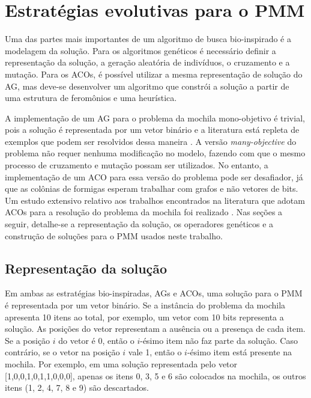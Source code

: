 \chapter[Estratégias evolutivas para o PMM]{Estratégias evolutivas para o PMM}

Uma das partes mais importantes de um algoritmo de busca bio-inspirado é a modelagem da solução. Para os algoritmos genéticos é necessário definir a representação da solução, a geração aleatória de indivíduos, o cruzamento e a mutação. Para os ACOs, é possível utilizar a mesma representação de solução do AG, mas deve-se desenvolver um algoritmo que constrói a solução a partir de uma estrutura de feromônios e uma heurística.

A implementação de um AG para o problema da mochila mono-objetivo é trivial, pois a solução é representada por um vetor binário e a literatura está repleta de exemplos que podem ser resolvidos dessa maneira \cite{KnapsackGA,Hristakeva2013}. A versão \textit{many-objective} do problema não requer nenhuma modificação no modelo, fazendo com que o mesmo processo de cruzamento e mutação possam ser utilizados. No entanto, a implementação de um ACO para essa versão do problema pode ser desafiador, já que as colônias de formigas esperam trabalhar com grafos e não vetores de bits. Um estudo extensivo relativo aos trabalhos encontrados na literatura que adotam ACOs para a resolução do problema da mochila foi realizado \cite{Ke2010,kong2008,changdar2013,Alaya2004,Alaya2007}. Nas seções a seguir, detalhe-se a representação da solução, os operadores genéticos e a construção de soluções para o PMM usados neste trabalho.

\section{Representação da solução}
Em ambas as estratégias bio-inspiradas, AGs e ACOs, uma solução para o PMM é representada por um vetor binário. Se a instância do problema da mochila apresenta 10 itens ao total, por exemplo, um vetor com 10 bits representa a solução. As posições do vetor representam a ausência ou a presença de cada item. Se a posição $i$ do vetor é 0, então o $i$-ésimo item não faz parte da solução. Caso contrário, se o vetor na posição $i$ vale 1, então o  $i$-ésimo item está presente na mochila. Por exemplo, em uma solução representada pelo vetor [1,0,0,1,0,1,1,0,0,0], apenas os itens 0, 3, 5 e 6 são colocados na mochila, os outros itens (1, 2, 4, 7, 8 e 9) são descartados.


